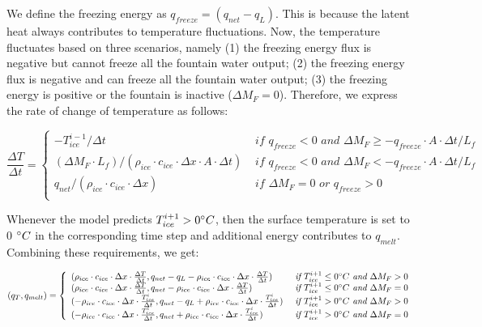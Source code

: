 \documentclass[utf8]{frontiersSCNS} %
\begin{document}
We define the freezing energy as $q_{freeze} = (q_{net}-q_{L})$. This is because the latent heat always contributes to
temperature fluctuations. Now, the temperature fluctuates based on three scenarios, namely (1) the freezing energy flux
is negative but cannot freeze all the fountain water output; (2) the freezing energy flux is negative and can freeze
all the fountain water output; (3) the freezing energy is positive or the fountain is inactive ($\Delta M_{F}=0$).
Therefore, we express the rate of change of temperature as follows:

\begin{equation} \frac{\Delta T}{\Delta t} = \left\{ \begin{array}{ll} -T_{ice}^{i-1}/\Delta t & \textit{ if }
     q_{freeze} < 0 \textit{ and } \Delta M_{F} \geq -q_{freeze}\cdot A \cdot \Delta t/L_f  \\ (\Delta M_{F}
    \cdot L_f )/(\rho_{ice} \cdot c_{ice} \cdot  \Delta x \cdot A \cdot \Delta t) & \textit{ if }  q_{freeze}< 0
    \textit{ and } \Delta M_{F} < -q_{freeze}\cdot A \cdot \Delta t/L_f  \\ q_{net}/ (\rho_{ice}\cdot c_{ice}
    \cdot \Delta x)& \textit{ if } \Delta M_{F} = 0 \textit{ or }  q_{freeze}> 0\\
    \end{array} \right.  \label{eqn:T} \end{equation}

Whenever the model predicts $T_{ice}^{i+1} > 0 \degree C$, then the surface temperature is set to 0 $\degree C$ in the
corresponding time step and additional energy contributes to $q_{melt}$. Combining these requirements, we get:

\begin{equation} (q_{T}, q_{melt}) = \left\{ \begin{array}{ll} ( \rho_{ice} \cdot c_{ice} \cdot  \Delta x \cdot
    \frac{\Delta T}{\Delta t}, q_{net}-q_{L}-\rho_{ice} \cdot c_{ice} \cdot  \Delta x \cdot \frac{\Delta T}{\Delta t})
    & \textit{ if } T_{ice}^{i+1}\leq 0 \degree C \textit{ and } \Delta M_{F} > 0\\ ( \rho_{ice} \cdot c_{ice} \cdot  \Delta x
    \cdot \frac{\Delta T}{\Delta t}, q_{net}-\rho_{ice} \cdot c_{ice} \cdot  \Delta x \cdot \frac{\Delta T}{\Delta t})
    & \textit{ if } T_{ice}^{i+1}\leq 0 \degree C \textit{ and } \Delta M_{F} = 0\\
        ( -\rho_{ice} \cdot c_{ice} \cdot  \Delta x \cdot \frac{T_{ice}^{i}}{\Delta t}, q_{net}-q_{L}+\rho_{ice} \cdot
    c_{ice} \cdot \Delta x \cdot \frac{T_{ice}^{i}}{\Delta t}) & \textit{ if } T_{ice}^{i+1}> 0 \degree C \textit{ and } \Delta
    M_{F} > 0\\ ( -\rho_{ice} \cdot c_{ice} \cdot  \Delta x \cdot \frac{T_{ice}^{i}}{\Delta t}, q_{net}+\rho_{ice}
    \cdot c_{ice} \cdot  \Delta x \cdot \frac{T_{ice}^{i}}{\Delta t}) & \textit{ if } T_{ice}^{i+1}> 0 \degree C \textit{ and }
\Delta M_{F} = 0\\ \end{array} \right.  \label{eqn:qt} \end{equation}
\end{document}
